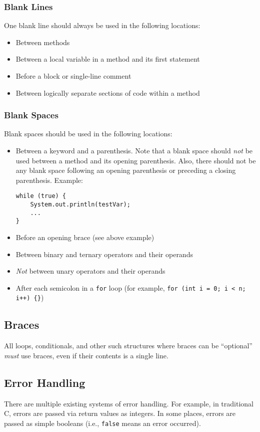 \documentclass[12pt,letter]{memoir} %
\begin{document}
			\subsubsection{Blank Lines}
				One blank line should always be used in the following locations:
				\begin{itemize}
					\item Between methods
					\item Between a local variable in a method and its first
						statement
					\item Before a block or single-line comment
					\item Between logically separate sections of code within a
						method
				\end{itemize}
			\subsubsection{Blank Spaces}
				Blank spaces should be used in the following locations:
				\begin{itemize}
					\item Between a keyword and a parenthesis. Note that a blank
						space should \emph{not} be used between a method and its
						opening parenthesis. Also, there should not be any blank
						space following an opening parenthesis or preceding a
						closing parenthesis. Example:
						\begin{lstlisting}
while (true) {
    System.out.println(testVar);
	...
}
						\end{lstlisting}
					\item Before an opening brace (see above example)
					\item Between binary and ternary operators and their
						operands
					\item \emph{Not} between unary operators and their operands
					\item After each semicolon in a \texttt{for} loop (for
						example, \texttt{for (int i = 0; i < n; i++) \{\}})
				\end{itemize}
		\subsection{Braces}
			All loops, conditionals, and other such structures where braces can
			be ``optional'' \emph{must} use braces, even if their contents is a
			single line.
		\subsection{Error Handling}
			There are multiple existing systems of error handling. For example,
			in traditional C, errors are passed via return values as integers.
			In some places, errors are passed as simple booleans (i.e.,
			\texttt{false} means an error occurred).
\end{document}

